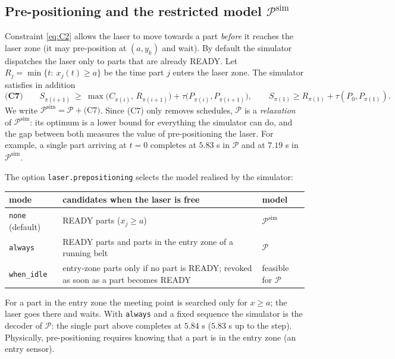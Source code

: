 \documentclass[11pt,a4paper]{article}
\theoremstyle{definition}
\theoremstyle{remark}
\newcommand{\Pb}{\mathcal{P}}
\begin{document}
\subsection{Pre-positioning and the restricted model \texorpdfstring{$\Pb^{\mathrm{sim}}$}{P-sim}}
Constraint \eqref{eq:C2} allows the laser to move towards a part \emph{before} it
reaches the laser zone (it may pre-position at $(a,y_k)$ and wait). By default the
simulator dispatches the laser only to parts that are already READY. Let
$R_j=\min\{t:\ x_j(t)\ge a\}$ be the time part $j$ enters the laser zone. The simulator
satisfies in addition
\begin{equation}\label{eq:C7}
\textbf{(C7)}\qquad S_{\pi(i+1)}\ \ge\ \max\bigl(C_{\pi(i)},\,R_{\pi(i+1)}\bigr)+\tau\bigl(P_{\pi(i)},P_{\pi(i+1)}\bigr),
\qquad S_{\pi(1)}\ge R_{\pi(1)}+\tau(P_0,P_{\pi(1)}).
\end{equation}
We write $\Pb^{\mathrm{sim}}=\Pb+\text{(C7)}$. Since (C7) only removes schedules, $\Pb$ is
a \emph{relaxation} of $\Pb^{\mathrm{sim}}$: its optimum is a lower bound for everything
the simulator can do, and the gap between both measures the value of pre-positioning
the laser. For example, a single part arriving at $t=0$ completes at $5.83$ s in $\Pb$
and at $7.19$ s in $\Pb^{\mathrm{sim}}$.

The option \texttt{laser.prepositioning} selects the model realised by the simulator:
\begin{center}
\begin{tabularx}{\linewidth}{@{}l X l@{}}
\toprule
mode & candidates when the laser is free & model\\
\midrule
\texttt{none} (default) & READY parts ($x_j\ge a$) & $\Pb^{\mathrm{sim}}$\\
\texttt{always} & READY parts and parts in the entry zone of a running belt & $\Pb$\\
\texttt{when\_idle} & entry-zone parts only if no part is READY; revoked as soon as a part becomes READY & feasible for $\Pb$\\
\bottomrule
\end{tabularx}
\end{center}
For a part in the entry zone the meeting point is searched only for $x\ge a$; the laser
goes there and waits. With \texttt{always} and a fixed sequence the simulator is the
decoder of $\Pb$: the single part above completes at $5.84$ s ($5.83$ s up to the step).
Physically, pre-positioning requires knowing that a part is in the entry zone (an entry
sensor).
\end{document}

